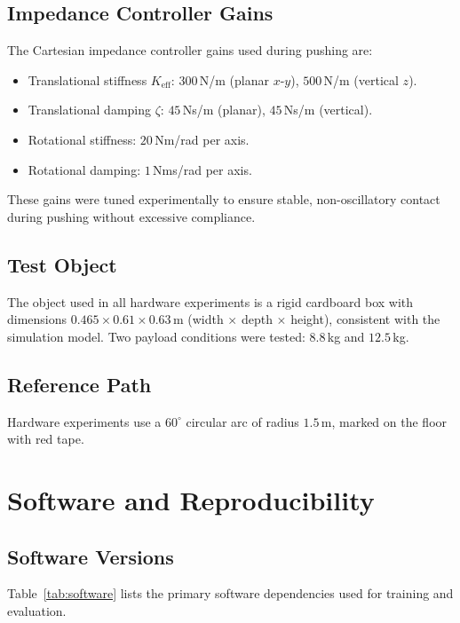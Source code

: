 \subsection{Impedance Controller Gains}

The Cartesian impedance controller gains used during pushing are:
\begin{itemize}
    \item Translational stiffness $K_{\mathrm{eff}}$: $300$\,N/m (planar $x$-$y$), $500$\,N/m (vertical $z$).
    \item Translational damping $\zeta$: $45$\,Ns/m (planar), $45$\,Ns/m (vertical).
    \item Rotational stiffness: $20$\,Nm/rad per axis.
    \item Rotational damping: $1$\,Nms/rad per axis.
\end{itemize}

These gains were tuned experimentally to ensure stable, non-oscillatory contact during pushing without excessive compliance.

\subsection{Test Object}

The object used in all hardware experiments is a rigid cardboard box with dimensions $0.465 \times 0.61 \times 0.63$\,m (width $\times$ depth $\times$ height), consistent with the simulation model.
Two payload conditions were tested: $8.8$\,kg and $12.5$\,kg.

\subsection{Reference Path}

Hardware experiments use a $60^\circ$ circular arc of radius $1.5$\,m, marked on the floor with red tape.


\section{Software and Reproducibility}\label{app:software}

\subsection{Software Versions}

Table~\ref{tab:software} lists the primary software dependencies used for training and evaluation.


